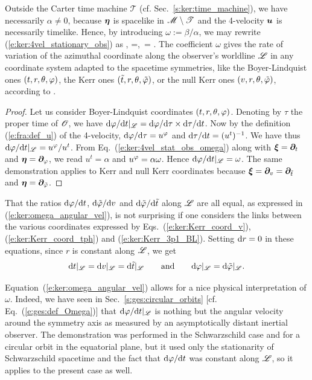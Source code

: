 Outside the Carter time machine $\mathscr{T}$ (cf. Sec.~\ref{s:ker:time_machine}), we have
necessarily $\alpha\neq 0$, because $\bm{\eta}$ is spacelike in $\mathscr{M}\setminus\mathscr{T}$
and the 4-velocity $\bm{u}$ is necessarily timelike. Hence,
by introducing $\omega := \beta/\alpha$, we may rewrite
(\ref{e:ker:4vel_stationary_obs}) as
\be \label{e:ker:4vel_stat_obs_omega}
    , \qquad \alpha=,\ \omega= .
\ee
The coefficient $\omega$ gives the rate of variation of the azimuthal coordinate along the observer's worldline $\mathscr{L}$
in any coordinate system adapted to the spacetime symmetries, like the Boyer-Lindquist ones
$(t,r,\theta,\varphi)$, the Kerr ones $({\tilde t}, r, \theta, {\tilde\varphi})$, or the null Kerr ones $(v,r,\theta,{\tilde\varphi})$,
according to
\be \label{e:ker:omega_angular_vel}
     .
\ee
\begin{proof}
Let us consider Boyer-Lindquist coordinates $(t,r,\theta,\varphi)$. Denoting by $\tau$
the proper time of $\mathscr{O}$, we have
$\mathrm{d}\varphi/\mathrm{d} t |_{\mathscr{L}}= {\mathrm{d} \varphi}/{\mathrm{d} \tau} \times {\mathrm{d}\tau}/{\mathrm{d} t}$. Now by the
definition (\ref{e:fra:def_u}) of the 4-velocity, ${\mathrm{d} \varphi}/{\mathrm{d} \tau} = u^\varphi$
and ${\mathrm{d} \tau}/{\mathrm{d} t} = (u^t)^{-1}$. We have thus $\mathrm{d}\varphi/\mathrm{d} t |_{\mathscr{L}}= u^\varphi/u^t$.
From Eq.~(\ref{e:ker:4vel_stat_obs_omega}) along with
$\bm{\xi} = \bm{\partial}_t$ and $\bm{\eta} = \bm{\partial}_\varphi$, we read $u^t = \alpha$
and $u^\varphi = \alpha\omega$. Hence $\mathrm{d}\varphi/\mathrm{d} t |_{\mathscr{L}}=\omega$.
The same demonstration applies to Kerr and null Kerr coordinates because
$\bm{\xi} = \bm{\partial}_v = \bm{\partial}_{{\tilde t}}$ and $\bm{\eta} = \bm{\partial}_{{\tilde\varphi}}$.
\end{proof}
\begin{remark}
That the ratios $\mathrm{d}\varphi/\mathrm{d} t$, $\mathrm{d}{\tilde\varphi}/\mathrm{d} v$ and $\mathrm{d}{\tilde\varphi}/\mathrm{d} {\tilde t}$ along $\mathscr{L}$
are all equal, as expressed in (\ref{e:ker:omega_angular_vel}), is not
surprising if one considers the links between the various coordinates
expressed by Eqs.~(\ref{e:ker:Kerr_coord_v}), (\ref{e:ker:Kerr_coord_tph}) and (\ref{e:ker:Kerr_3p1_BL}).
Setting $\mathrm{d} r = 0$ in these equations, since $r$ is constant along $\mathscr{L}$, we get
\[
    \mathrm{d} t |_{\mathscr{L}} = \mathrm{d} v |_{\mathscr{L}} = \mathrm{d}{\tilde t} |_{\mathscr{L}} \qquad\mbox{and}\qquad
    \mathrm{d} \varphi |_{\mathscr{L}} = \mathrm{d} {\tilde\varphi} | _{\mathscr{L}} .
\]
\end{remark}

Equation~(\ref{e:ker:omega_angular_vel}) allows for a nice physical interpretation of
$\omega$. Indeed, we have seen in Sec.~\ref{s:ges:circular_orbits} [cf. Eq.~(\ref{e:ges:def_Omega})]
that $\mathrm{d}\varphi/\mathrm{d} t |_{\mathscr{L}}$ is nothing
but the angular velocity around the symmetry axis as measured by an asymptotically distant inertial observer.
The demonstration was performed in the Schwarzschild case and for a circular orbit in the equatorial plane, but
it used only the stationarity of Schwarzschild spacetime and the fact that ${\mathrm{d}\varphi}/{\mathrm{d} t}$ was constant
along $\mathscr{L}$, so it applies to the present case as well.



